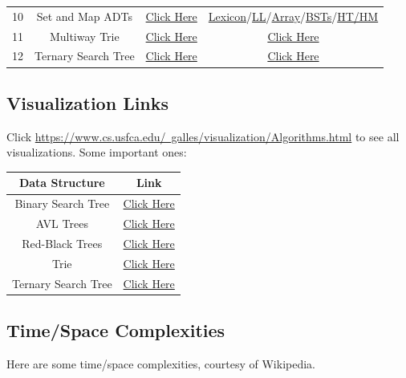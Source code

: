\documentclass[letterpaper]{article}
\begin{document}
\begin{center}
\begin{tabular}{|c|c|c|c|}
        10 & Set and Map ADTs & \href{https://edstem.org/us/courses/6609/lessons/22863/slides/132039}{Click Here} & \href{https://stepik.org/lesson/30821/step/1?unit=11598}{Lexicon}/\href{https://stepik.org/lesson/31305/step/1?unit=11644}{LL}/\href{https://stepik.org/lesson/31306/step/1?unit=11645}{Array}/\href{https://stepik.org/lesson/31307/step/1?unit=11646}{BSTs}/\href{https://stepik.org/lesson/31308/step/1?unit=11647}{HT/HM} \\ 
        11 & Multiway Trie & \href{https://edstem.org/us/courses/6609/lessons/22864/slides/132045}{Click Here} & \href{https://stepik.org/lesson/30819/step/1?unit=11596}{Click Here} \\ 
        12 & Ternary Search Tree & \href{https://edstem.org/us/courses/6609/lessons/22865/slides/132054}{Click Here} & \href{https://stepik.org/lesson/30820/step/1?unit=11597}{Click Here} \\ 
        \hline 
    \end{tabular}
\end{center}


\subsection{Visualization Links}
Click \href{here}{https://www.cs.usfca.edu/~galles/visualization/Algorithms.html} to see all visualizations. Some important ones: 
\begin{center}
    \begin{tabular}{|c|c|}
        \hline 
        \textbf{Data Structure} & \textbf{Link} \\ 
        \hline 
        Binary Search Tree & \href{https://www.cs.usfca.edu/~galles/visualization/BST.html}{Click Here} \\ 
        AVL Trees & \href{https://www.cs.usfca.edu/~galles/visualization/AVLtree.html}{Click Here} \\ 
        Red-Black Trees & \href{https://www.cs.usfca.edu/~galles/visualization/RedBlack.html}{Click Here} \\ 
        Trie & \href{https://www.cs.usfca.edu/~galles/visualization/Trie.html}{Click Here} \\ 
        Ternary Search Tree & \href{https://www.cs.usfca.edu/~galles/visualization/TST.html}{Click Here} \\ 
        \hline 
    \end{tabular}
\end{center}

\subsection{Time/Space Complexities}
Here are some time/space complexities, courtesy of Wikipedia. 
\end{document}
